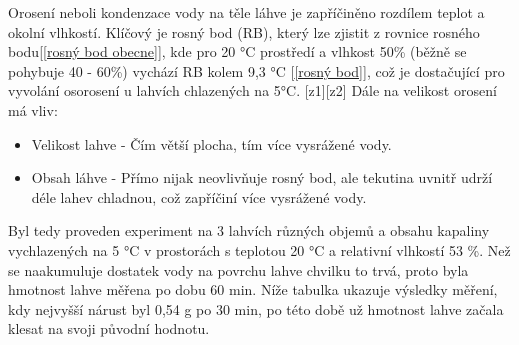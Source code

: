 Orosení neboli kondenzace vody na těle láhve je zapříčiněno rozdílem teplot a okolní vlhkostí. Klíčový je rosný bod (RB), který lze zjistit z rovnice rosného bodu[\ref{rosný bod obecne}], kde pro 20 °C prostředí a vlhkost 50\% (běžně se pohybuje 40 - 60\%) vychází RB kolem 9,3 °C [\ref{rosný bod}], což je dostačující pro vyvolání osorosení u lahvích chlazených na 5°C. [z1][z2]
Dále na velikost orosení má vliv:
\begin{itemize}
    \item Velikost lahve - Čím větší plocha, tím více vysrážené vody.
    \item Obsah láhve - Přímo nijak neovlivňuje rosný bod, ale tekutina uvnitř udrží déle lahev chladnou, což zapříčiní více vysrážené vody.
\end{itemize}
\smallskip
Byl tedy proveden experiment na 3 lahvích různých objemů a obsahu kapaliny vychlazených na 5 °C v prostorách s teplotou 20 °C a relativní vlhkostí 53 \%. Než se naakumuluje dostatek vody na povrchu lahve chvilku to trvá, proto byla hmotnost lahve měřena po dobu 60 min. Níže tabulka ukazuje výsledky měření, kdy nejvyšší nárust byl 0,54 g po 30 min, po této době už hmotnost lahve začala klesat na svoji původní hodnotu.


